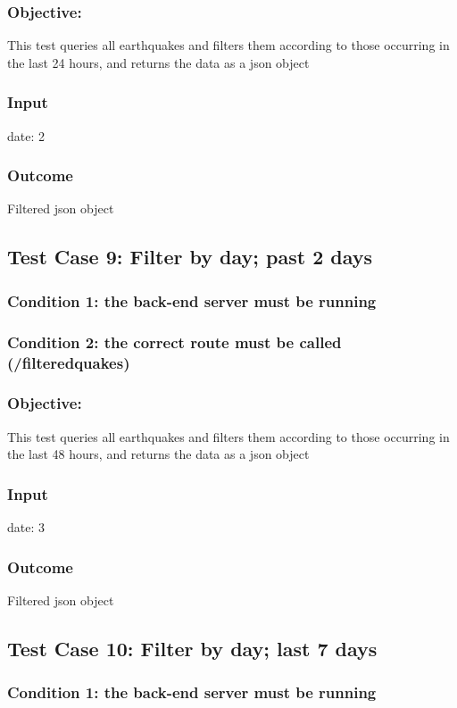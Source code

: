 \subsubsection{Objective: } This test queries all earthquakes and filters them according to those occurring in the last 24 hours, and returns the data as a json object
\subsubsection{Input}
{date: 2}
\subsubsection{Outcome}
Filtered json object

\subsection{Test Case 9: Filter by day; past 2 days}

\subsubsection{Condition 1: the back-end server must be running}
\subsubsection{Condition 2: the correct route must be called (/filteredquakes)}
\subsubsection{Objective: } This test queries all earthquakes and filters them according to those occurring in the last 48 hours, and returns the data as a json object
\subsubsection{Input}
{date: 3}
\subsubsection{Outcome}
Filtered json object

\subsection{Test Case 10: Filter by day; last 7 days}

\subsubsection{Condition 1: the back-end server must be running}
